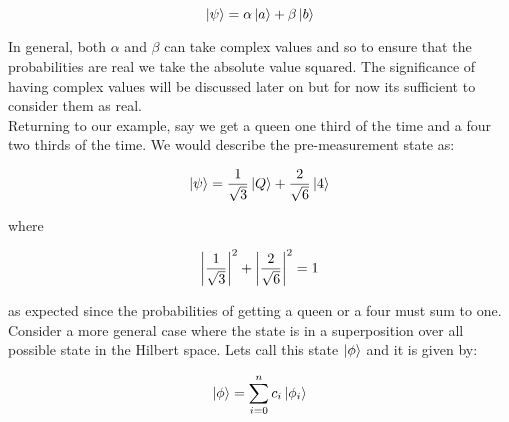 \begin{equation}
\left\vert{\psi}\right\rangle = \alpha \left\vert{a}\right\rangle + \beta \left\vert{b}\right\rangle
\end{equation}

In general, both $\alpha$ and $\beta$ can take complex values and so to ensure that the probabilities are real we take the absolute value squared. The significance of having complex values will be discussed later on but for now its sufficient to consider them as real.\\

Returning to our example, say we get a queen one third of the time and a four two thirds of the time. We would describe the pre-measurement state as:

\begin{equation}
\left\vert{\psi}\right\rangle = \frac{1}{\sqrt{3}} \left\vert{Q}\right\rangle + \frac{2}{\sqrt{6}}  \left\vert{4}\right\rangle
\end{equation}

where

\begin{equation}
\abs{\frac{1}{\sqrt{3}}}^{2}+ \abs{\frac{2}{\sqrt{6}}}^{2} =1
\end{equation}

as expected since the probabilities of getting a queen or a four must sum to one. Consider a more general case where the state is in a superposition over all possible state in the Hilbert space. Lets call this state $\left\vert{\phi}\right\rangle$ and it is given by:

\begin{equation}
\left\vert{\phi}\right\rangle = \sum_{i=0}^{n} c_{i}\left\vert{\phi_{i}}\right\rangle
\label{equation:bigphi}
\end{equation}




